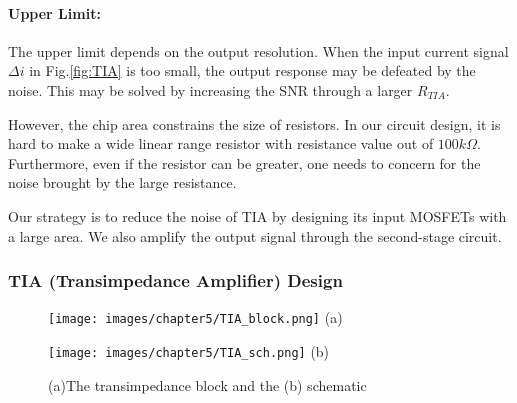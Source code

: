 \paragraph*{Upper Limit:}
The upper limit depends on the output resolution.
When the input current signal $\Delta i$ in Fig.\ref{fig:TIA} is too small, the output response may be defeated by the noise.
This may be solved by increasing the SNR through a larger $R_{TIA}$.
{However, the chip area constrains the size of resistors.
In our circuit design, it is hard to make a wide linear range resistor with resistance value out of $100k\Omega$.
Furthermore, even if the resistor can be greater, one needs to concern for the noise brought by the large resistance.

Our strategy is to reduce the noise of TIA by designing its input MOSFETs with a large area.
We also amplify the output signal through the second-stage circuit.

\subsubsection{TIA (Transimpedance Amplifier) Design}


\begin{figure}[!htbp]
    \centering
    \begin{minipage}[t]{0.4\textwidth}
        \texttt{[image: images/chapter5/TIA\_block.png]}
        \raggedleft
        (a)
    \end{minipage}
    \hfill
    \begin{minipage}[t]{0.5\textwidth}
        \texttt{[image: images/chapter5/TIA\_sch.png]}
        \raggedleft
        (b)
    \end{minipage}
    \caption{(a)The transimpedance block and the (b) schematic}
    \label{fig:TIA_sch}
\end{figure}

}
